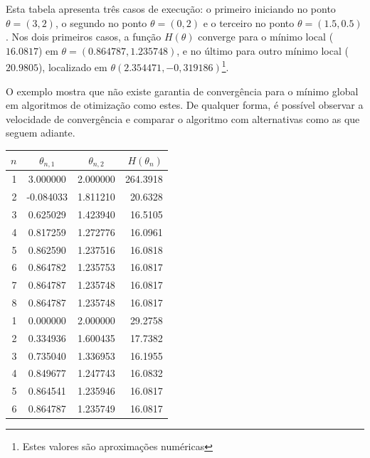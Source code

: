 \documentclass{abnt}
\begin{document}
Esta tabela apresenta três casos de execução: o primeiro iniciando no ponto $\theta=(3,2)$, o segundo no ponto $\theta=(0,2)$ e o terceiro no ponto $\theta=(1.5, 0.5)$. Nos dois primeiros casos, a função $H(\theta)$ converge para o mínimo local ($16.0817$) em $\theta=(0.864787,1.235748)$, e no último para outro mínimo local ($20.9805$), localizado em $\theta(2.354471,-0,319186)$\footnote{Estes valores são aproximações numéricas}.

O exemplo mostra que não existe garantia de convergência para o mínimo global em algoritmos de otimização como estes. De qualquer forma, é possível observar a velocidade de convergência e comparar o algoritmo com alternativas como as que seguem adiante.

\begin{table}
        \begin{center}
                \begin{tabular}{ r | c c r  }
                        \hline
                        $n$ & $\theta_{n,1}$ & $\theta_{n,2}$ & $H(\theta_n)$ \\
                        \hline
                        1 & 3.000000 & 2.000000 & 264.3918 \\
                        2 & -0.084033 & 1.811210 & 20.6328 \\
                        3 & 0.625029 & 1.423940 & 16.5105 \\
                        4 & 0.817259 & 1.272776 & 16.0961 \\
                        5 & 0.862590 & 1.237516 & 16.0818 \\
                        6 & 0.864782 & 1.235753 & 16.0817 \\
                        7 & 0.864787 & 1.235748 & 16.0817 \\
                        8 & 0.864787 & 1.235748 & 16.0817 \\
                        \hline
                        1 & 0.000000 & 2.000000 & 29.2758 \\
                        2 & 0.334936 & 1.600435 & 17.7382 \\
                        3 & 0.735040 & 1.336953 & 16.1955 \\
                        4 & 0.849677 & 1.247743 & 16.0832 \\
                        5 & 0.864541 & 1.235946 & 16.0817 \\
                        6 & 0.864787 & 1.235749 & 16.0817 \\

\end{tabular}
\end{center}
\end{table}
\end{document}
